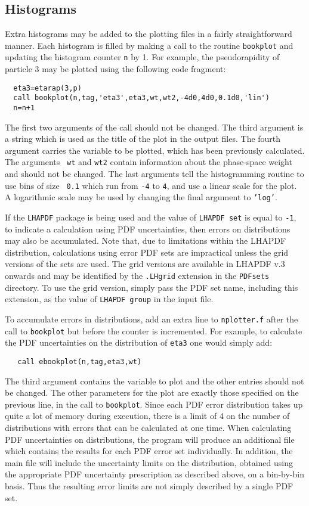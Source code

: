 \documentclass[12pt]{article}
\begin{document}
\subsection{Histograms}
\label{sec:histos}

Extra histograms may be added to the plotting files in
a fairly straightforward manner. Each histogram is filled by making
a call to the routine {\tt bookplot} and updating the histogram
counter {\tt n} by 1. For example, the pseudorapidity of particle $3$
may be plotted using the following code fragment:

\begin{verbatim}
  eta3=etarap(3,p)
  call bookplot(n,tag,'eta3',eta3,wt,wt2,-4d0,4d0,0.1d0,'lin')
  n=n+1
\end{verbatim}
The first two arguments of the call should not be changed. The third
argument is a string which is used as the title of the plot in the
output files. The fourth argument carries the variable to
be plotted, which has been previously calculated. The arguments {\tt
wt} and {\tt wt2} contain information about the phase-space weight and
should not be changed. The
last arguments tell the histogramming routine to use bins of size {\tt
0.1} which run from {\tt -4} to {\tt 4}, and use a linear scale for
the plot. A logarithmic scale may be used by changing the final
argument to {\tt 'log'}.

If the {\tt LHAPDF} package is being used and the value of
{\tt LHAPDF set} is equal to {\tt -1},  to indicate a calculation using
PDF uncertainties, then errors on distributions may also be accumulated.
Note that, due to limitations within the LHAPDF distribution, calculations
using error PDF sets are impractical unless the grid versions of the sets
are used. The grid versions are available in LHAPDF v.3 onwards and may be identified
by the {\tt .LHgrid} extension in the {\tt PDFsets} directory. To use the
grid version, simply pass the PDF set name, including this extension, as
the value of {\tt LHAPDF group} in the input file.
 
To accumulate errors in distributions, add an extra
line to {\tt nplotter.f} after the
call to {\tt bookplot} but before the counter is incremented. For
example, to calculate the PDF uncertainties on the distribution
of {\tt eta3} one would simply add:
\begin{verbatim}
   call ebookplot(n,tag,eta3,wt)
\end{verbatim}
The third argument contains the variable to plot and the other entries
should not be changed. The other parameters for the plot are exactly
those specified on the previous line, in the call to {\tt bookplot}.
Since each PDF error distribution takes up quite a lot of memory
during execution, there is a limit of 4 on the number of distributions
with errors that can be calculated at one time. When calculating
PDF uncertainties on distributions, the program will produce an
additional file which contains the results for each PDF error set
individually. In addition, the main file will include the uncertainty
limits on the distribution, obtained using the appropriate PDF uncertainty
prescription as described above, on a bin-by-bin basis. Thus
the resulting error limits are not simply described by a single PDF
set.
\end{document}
